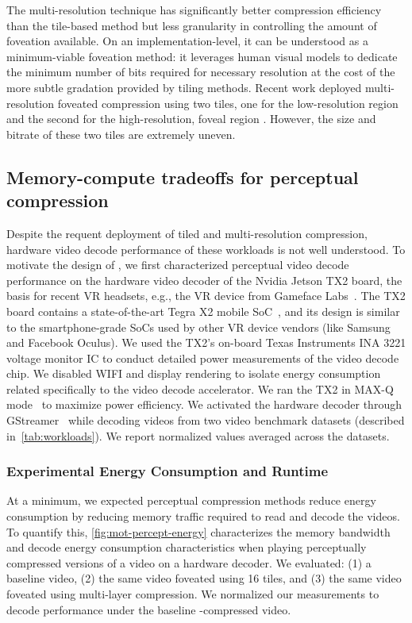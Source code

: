 The multi-resolution technique has significantly better compression efficiency than the tile-based method but less granularity in controlling the amount of foveation available.
On an implementation-level, it can be understood as a minimum-viable foveation method: it leverages human visual models to dedicate the minimum number of bits required for necessary resolution at the cost of the more subtle gradation provided by tiling methods.
Recent work deployed multi-resolution foveated compression using two tiles, one for the low-resolution region and the second for the high-resolution, foveal region \cite{google-foveation}.
However, the size and bitrate of these two tiles are extremely uneven.

\subsection{Memory-compute tradeoffs for perceptual compression}
Despite the requent deployment of tiled and multi-resolution compression, hardware video decode performance of these workloads is not well understood.
To motivate the design of \nameArch, we first characterized perceptual video decode performance on the hardware video decoder of the Nvidia Jetson TX2 board, the basis for recent VR headsets, e.g., the VR device from Gameface Labs~\cite{gameface}.
The TX2 board contains a state-of-the-art Tegra X2 mobile SoC~\cite{nvidia-jetson-tx2}, and its design is similar to the smartphone-grade SoCs used by other VR device vendors (like Samsung and Facebook Oculus).
We used the TX2's on-board Texas Instruments INA 3221 voltage monitor IC to conduct detailed power measurements of the video decode chip.
We disabled WIFI and display rendering to isolate energy consumption related specifically to the video decode accelerator.
We ran the TX2 in MAX-Q mode~\cite{nvidia-jetson-reference} to maximize power efficiency.
We activated the hardware decoder through GStreamer~\cite{gstreamer} while decoding videos from two video benchmark datasets (described in~\ref{tab:workloads}). We report normalized values averaged across the datasets.

\vdoOverview

\subsubsection{Experimental Energy Consumption and Runtime}

At a minimum, we expected perceptual compression methods reduce energy consumption by reducing memory traffic required to read and decode the videos.
To quantify this, \ref{fig:mot-percept-energy} characterizes the memory bandwidth and decode energy consumption characteristics when playing perceptually compressed versions of a video on a hardware decoder.
We evaluated: (1) a baseline \hevc video, (2) the same \hevc video foveated using 16 tiles, and (3) the same \hevc video foveated using multi-layer compression.
We normalized our measurements to decode performance under the baseline \hevc-compressed video.

